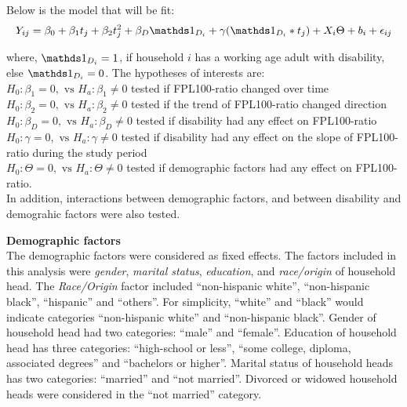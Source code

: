 \documentclass[11pt]{extarticle} %
\begin{document}
Below is the model that will be fit: 
\vspace{-0.5cm}
\begin{equation}
Y_{ij} = \beta_0 + \beta_1 t_j + \beta_2 t_j^2 + \beta_D \Ind_{D_i} + \gamma(\Ind_{D_i}*t_j) + X_i\Theta + b_i + \epsilon_{ij}
\label{eq:MixedEffects2}
\end{equation}

where, $\Ind_{D_i} = 1$, if household $i$ has a working age adult with disability, else $\Ind_{D_i} = 0$. The hypotheses of interests are: \\
$H_0: \beta_1 = 0, \text{  vs  } H_a: \beta_1 \ne 0$ tested if FPL100-ratio changed over time \\
$H_0: \beta_2 = 0, \text{  vs  } H_a: \beta_2 \ne 0$ tested if the trend of FPL100-ratio changed direction \\
$H_0: \beta_D = 0, \text{  vs  } H_a: \beta_D \ne 0$ tested if disability had any effect on FPL100-ratio\\
$H_0: \gamma = 0, \text{  vs  } H_a: \gamma \ne 0$ tested if disability had any effect on the slope of FPL100-ratio during the study period\\
$H_0: \Theta = 0, \text{  vs  } H_a: \Theta \ne 0$ tested if demographic factors had any effect on FPL100-ratio. \\
In addition, interactions between demographic factors, and between disability and demograhic factors were also tested. 

\noindent
{\bf{Demographic factors}}\\
The demographic factors were considered as fixed effects. The factors included in this analysis were {\emph{gender}}, {\emph{marital status}}, {\emph{education}}, and {\emph{race/origin}} of household head. The {\emph{Race/Origin}} factor included ``non-hispanic white'', ``non-hispanic black'', ``hispanic'' and ``others''. For simplicity, ``white'' and ``black'' would indicate categories ``non-hispanic white'' and ``non-hispanic black''. Gender of household head had two categories: ``male'' and ``female''. Education of household head has three categories: ``high-school or less'', ``some college, diploma, associated degrees'' and ``bachelors or higher''. Marital status of household heads has two categories: ``married'' and ``not married''. Divorced or widowed household heads were considered in the ``not married'' category. 
\end{document}
